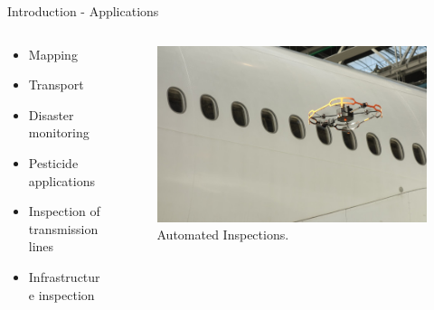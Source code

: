 \begin{frame}{Introduction - Applications}
    \begin{columns}
        \begin{column}{0.6\textwidth}
        \begin{itemize}
            \item Mapping
            \item Transport
            \item Disaster monitoring
            \item Pesticide applications
            \item Inspection of transmission lines
            \item Infrastructure inspection
        \end{itemize}
        \end{column}
        \begin{column}{0.4\textwidth}  %
                \begin{figure}
                    \centering
                    \includegraphics[width=1\textwidth]{img/inspection-drone.jpg}
                    \caption{Automated Inspections.}
                    \label{fig:uav-insp}
                \end{figure}
        \end{column}
    \end{columns}
\end{frame}